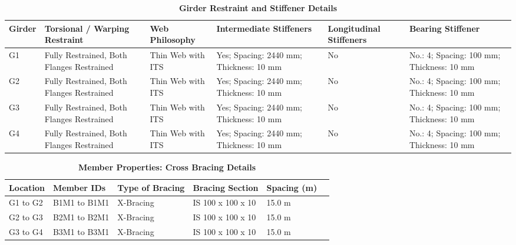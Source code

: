 \documentclass[12pt,a4paper]{report}
\numberwithin{table}{chapter}
\numberwithin{figure}{chapter}
\begin{document}
\vspace{4pt}
\begin{longtable}{|L{1.4cm}|p{2.2cm}|p{2.2cm}|p{3.0cm}|p{2.4cm}|p{2.2cm}|}
\caption{\textbf{Girder Restraint and Stiffener Details}}\\
\hline
\textbf{Girder} & \textbf{Torsional / Warping Restraint} & \textbf{Web Philosophy} & \textbf{Intermediate Stiffeners} & \textbf{Longitudinal Stiffeners} & \textbf{Bearing Stiffener} \\[6pt]
\hline
\endfirsthead
\endhead

G1 & Fully Restrained, Both Flanges Restrained & Thin Web with ITS & Yes; Spacing: 2440 mm; Thickness: 10 mm & No & No.: 4; Spacing: 100 mm; Thickness: 10 mm \\[8pt]
\hline
G2 & Fully Restrained, Both Flanges Restrained & Thin Web with ITS & Yes; Spacing: 2440 mm; Thickness: 10 mm & No & No.: 4; Spacing: 100 mm; Thickness: 10 mm \\[8pt]
\hline
G3 & Fully Restrained, Both Flanges Restrained & Thin Web with ITS & Yes; Spacing: 2440 mm; Thickness: 10 mm & No & No.: 4; Spacing: 100 mm; Thickness: 10 mm \\[8pt]
\hline
G4 & Fully Restrained, Both Flanges Restrained & Thin Web with ITS & Yes; Spacing: 2440 mm; Thickness: 10 mm & No & No.: 4; Spacing: 100 mm; Thickness: 10 mm \\[8pt]
\hline
\end{longtable}



\newpage

\vspace{0.4em}
\setlength{\tabcolsep}{4pt}
\setlength\LTleft{0pt}
\setlength\LTright{\fill}

\begin{longtable}{|L{2.2cm}|L{2.2cm}|L{3.0cm}|L{2.5cm}|C{1.8cm}|C{1.8cm}|}
\caption{\textbf{Member Properties: Cross Bracing Details}}\\
\hline
\textbf{Location} & \textbf{Member IDs} & \textbf{Type of Bracing} & \textbf{Bracing Section} & \textbf{Spacing (m)} \\
\hline
G1 to G2 & B1M1 to B1M1 & X-Bracing & IS 100 x 100 x 10 & 15.0 m \\[6pt]
\hline
G2 to G3 & B2M1 to B2M1 & X-Bracing & IS 100 x 100 x 10 & 15.0 m \\[6pt]
\hline
G3 to G4 & B3M1 to B3M1 & X-Bracing & IS 100 x 100 x 10 & 15.0 m \\[6pt]
\hline
\end{longtable}
\end{document}
